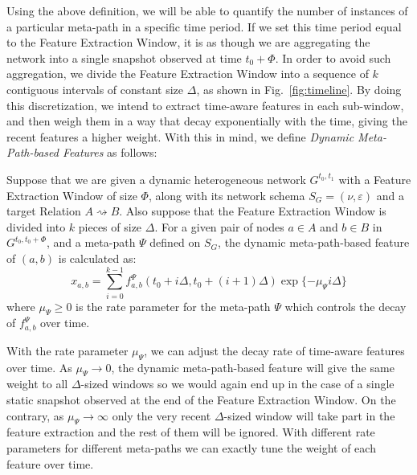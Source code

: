 Using the above definition, we will be able to quantify the number of instances of a particular meta-path in a specific time period. If we set this time period equal to the Feature Extraction Window, it is as though we are aggregating the network into a single snapshot observed at time $t_0+\Phi$. In order to avoid such aggregation, we divide the Feature Extraction Window into a sequence of $k$ contiguous intervals of constant size $\Delta$, as shown in Fig.~\ref{fig:timeline}. By doing this discretization, we intend to extract time-aware features in each sub-window, and then weigh them in a way that decay exponentially with the time, giving the recent features a higher weight. With this in mind, we define \emph{Dynamic Meta-Path-based Features} as follows:

\begin{definition}
Suppose that we are given a dynamic heterogeneous network $G^{t_0,t_1}$ with a Feature Extraction Window of size $\Phi$, along with its network schema $S_G=(\nu, \varepsilon)$ and a target Relation $A\rightsquigarrow B$. Also suppose that the Feature Extraction Window is divided into $k$ pieces of size $\Delta$. For a given pair of nodes $a\in A$ and $b\in B$ in $G^{t_0,t_0+\Phi}$, and a meta-path $\Psi$ defined on $S_G$, the dynamic meta-path-based feature of $(a,b)$ is calculated as:
\begin{equation}
x_{a,b}=\sum_{i=0}^{k-1}f_{a,b}^\Psi(t_0+i\Delta, t_0+(i+1)\Delta)\exp\{-\mu_\Psi i\Delta\}
\end{equation}
where $\mu_\Psi\ge0$ is the rate parameter for the meta-path $\Psi$ which controls the decay of $f_{a,b}^\Psi$ over time.
\end{definition}

With the rate parameter $\mu_\Psi$, we can adjust the decay rate of time-aware features over time. As $\mu_\Psi\rightarrow 0$, the dynamic meta-path-based feature will give the same weight to all $\Delta$-sized windows so we would again end up in the case of a single static snapshot observed at the end of the Feature Extraction Window. On the contrary, as $\mu_\Psi\rightarrow\infty$ only the very recent $\Delta$-sized window will take part in the feature extraction and the rest of them will be ignored. With different rate parameters for different meta-paths we can exactly tune the weight of each feature over time.


